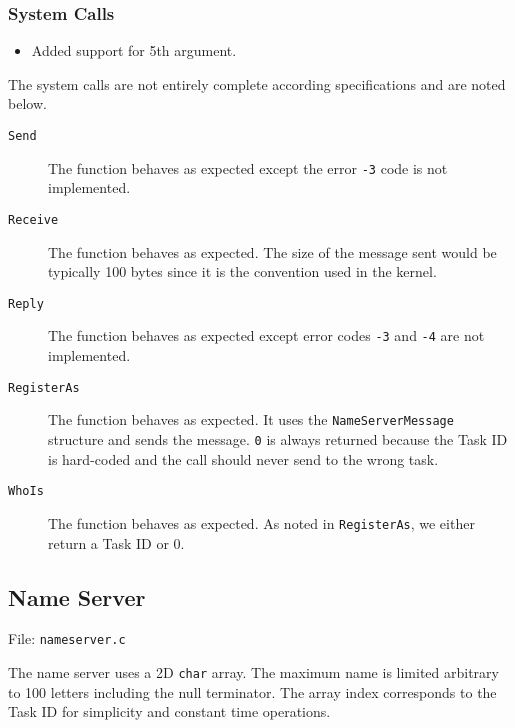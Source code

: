 \documentclass[letterpaper, 11pt]{article}
\begin{document}
\subsubsection{System Calls%
  \label{system-calls}%
}
%
\begin{itemize}

\item Added support for 5th argument.

\end{itemize}

The system calls are not entirely complete according specifications and are noted below.
%
\begin{description}
\item[{\texttt{Send}}] \leavevmode 
The function behaves as expected except the error \texttt{-3} code is not implemented.

\item[{\texttt{Receive}}] \leavevmode 
The function behaves as expected. The size of the message sent would be typically 100 bytes since it is the convention used in the kernel.

\item[{\texttt{Reply}}] \leavevmode 
The function behaves as expected except error codes \texttt{-3} and \texttt{-4} are not implemented.

\item[{\texttt{RegisterAs}}] \leavevmode 
The function behaves as expected. It uses the \texttt{NameServerMessage} structure and sends the message. \texttt{0} is always returned because the Task ID is hard-coded and the call should never send to the wrong task.

\item[{\texttt{WhoIs}}] \leavevmode 
The function behaves as expected. As noted in \texttt{RegisterAs}, we either return a Task ID or 0.

\end{description}


\subsection{Name Server%
  \label{name-server}%
}

File: \texttt{nameserver.c}

The name server uses a 2D \texttt{char} array. The maximum name is limited arbitrary to 100 letters including the null terminator. The array index corresponds to the Task ID for simplicity and constant time operations.
\end{document}
